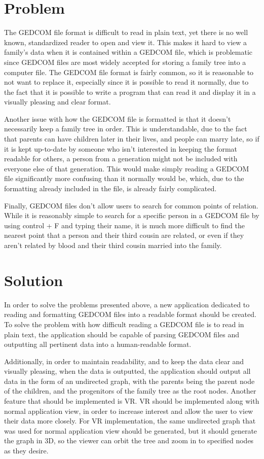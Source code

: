 \documentclass[onecolumn, draftclsnofoot,10pt, compsoc]{IEEEtran}
\begin{document}
\section{Problem}
The GEDCOM file format is difficult to read in plain text, yet there is no well known, standardized reader to open and view it. This makes it hard to view a family's data when it is contained within a GEDCOM file, which is problematic since GEDCOM files are most widely accepted for storing a family tree into a computer file. The GEDCOM file format is fairly common, so it is reasonable to not want to replace it, especially since it is possible to read it normally, due to the fact that it is possible to write a program that can read it and display it in a visually pleasing and clear format. 

Another issue with how the GEDCOM file is formatted is that it doesn't necessarily keep a family tree in order. This is understandable, due to the fact that parents can have children later in their lives, and people can marry late, so if it is kept up-to-date by someone who isn't interested in keeping the format readable for others, a person from a generation might not be included with everyone else of that generation. This would make simply reading a GEDCOM file significantly more confusing than it normally would be, which, due to the formatting already included in the file, is already fairly complicated. 

Finally, GEDCOM files don't allow users to search for common points of relation. While it is reasonably simple to search for a specific person in a GEDCOM file by using control + F and typing their name, it is much more difficult to find the nearest point that a person and their third cousin are related, or even if they aren't related by blood and their third cousin married into the family.


\section{Solution}
In order to solve the problems presented above, a new application dedicated to reading and formatting GEDCOM files into a readable format should be created. To solve the problem with how difficult reading a GEDCOM file is to read in plain text, the application should be capable of parsing GEDCOM files and outputting all pertinent data into a human-readable format.

Additionally, in order to maintain readability, and to keep the data clear and visually pleasing, when the data is outputted, the application should output all data in the form of an undirected graph, with the parents being the parent node of the children, and the progenitors of the family tree as the root nodes. Another feature that should be implemented is VR. VR should be implemented along with normal application view, in order to increase interest and allow the user to view their data more closely. For VR implementation, the same undirected graph that was used for normal application view should be generated, but it should generate the graph in 3D, so the viewer can orbit the tree and zoom in to specified nodes as they desire.
\end{document}
